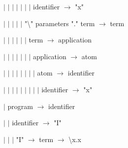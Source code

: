 \documentclass{article}
\begin{document}
    $\vert$ $\vert$ $\vert$ $\vert$ $\vert$ $\vert$ $\vert$ identifier $\rightarrow$ "x"

    $\vert$ $\vert$ $\vert$ $\vert$ $\vert$ "\textbackslash" parameters "." term $\rightarrow$ term

    $\vert$ $\vert$ $\vert$ $\vert$ $\vert$ $\vert$ term $\rightarrow$ application

    $\vert$ $\vert$ $\vert$ $\vert$ $\vert$ $\vert$ $\vert$ application $\rightarrow$ atom

    $\vert$ $\vert$ $\vert$ $\vert$ $\vert$ $\vert$ $\vert$ $\vert$ atom $\rightarrow$ identifier

    $\vert$ $\vert$ $\vert$ $\vert$ $\vert$ $\vert$ $\vert$ $\vert$ $\vert$ identifier $\rightarrow$ "x"

    $\vert$ program $\rightarrow$ identifier

    $\vert$ $\vert$ identifier $\rightarrow$ "I"

    $\vert$ $\vert$ $\vert$ "I" $\rightarrow$ term $\rightarrow$ \textbackslash x.x
\end{document}
